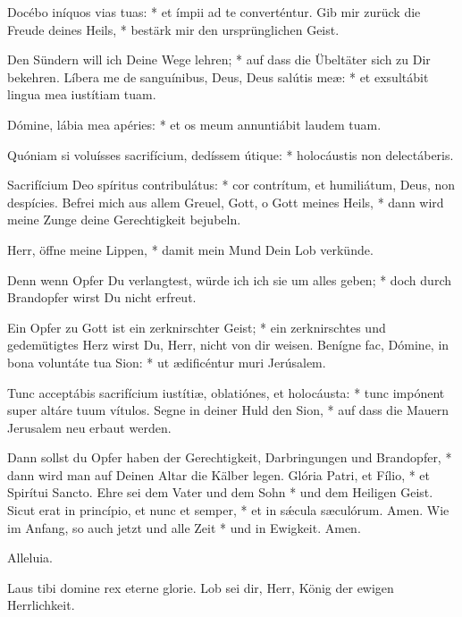 \documentclass[fontsize=10pt,paper=A5,twoside,BCOR=1mm,DIV=21,headinclude]{scrarticle}
\begin{document}
\begin{paracol}{2}
\begin{psalmus}
Docébo iníquos vias tuas: * et ímpii ad te converténtur.
\switchcolumn
Gib mir zurück die Freude deines Heils, * bestärk mir den ursprünglichen Geist.

Den Sündern will ich Deine Wege lehren; * auf dass die Übeltäter sich zu Dir bekehren.
\switchcolumn*
Líbera me de sanguínibus, Deus, Deus salútis meæ: * et exsultábit lingua mea iustítiam tuam.

Dómine, lábia mea apéries: * et os meum annuntiábit laudem tuam.

Quóniam si voluísses sacrifícium, dedíssem útique: * holocáustis non delectáberis.

Sacrifícium Deo spíritus contribulátus: * cor contrítum, et humiliátum, Deus, non despícies.
\switchcolumn
Befrei mich aus allem Greuel, Gott, o Gott meines Heils, * dann wird meine Zunge deine Gerechtigkeit bejubeln.

Herr, öffne meine Lippen, * damit mein Mund Dein Lob verkünde.

Denn wenn Opfer Du verlangtest, würde ich ich sie um alles geben; * doch durch Brandopfer wirst Du nicht erfreut.

Ein Opfer zu Gott ist ein zerknirschter Geist; * ein zerknirschtes und gedemütigtes Herz wirst Du, Herr, nicht von dir weisen.
\switchcolumn*
Benígne fac, Dómine, in bona voluntáte tua Sion: * ut ædificéntur muri Jerúsalem.

Tunc acceptábis sacrifícium iustítiæ, oblatiónes, et holocáusta: * tunc impónent super altáre tuum vítulos.
\switchcolumn
Segne in deiner Huld den Sion, * auf dass die Mauern Jerusalem neu erbaut werden.

Dann sollst du Opfer haben der Gerechtigkeit, Darbringungen und Brandopfer, * dann wird man auf Deinen Altar die Kälber legen.
\switchcolumn*
Glória Patri, et Fílio, * et Spirítui Sancto.
	\switchcolumn
	Ehre sei dem Vater und dem Sohn * und dem Heiligen Geist.
\switchcolumn*
Sicut erat in princípio, et nunc et semper, * et in s\'æcula sæculórum. Amen.
	\switchcolumn
	Wie im Anfang, so auch jetzt und alle Zeit * und in Ewigkeit. Amen.
\end{psalmus}
\end{paracol}

 Alleluia.


\begin{paracol}{2}\pcb
\A Laus tibi domine rex eterne glorie.
	\switchcolumn 
	\A Lob sei dir, Herr, König der ewigen Herrlichkeit.
\end{paracol}
\end{document}
